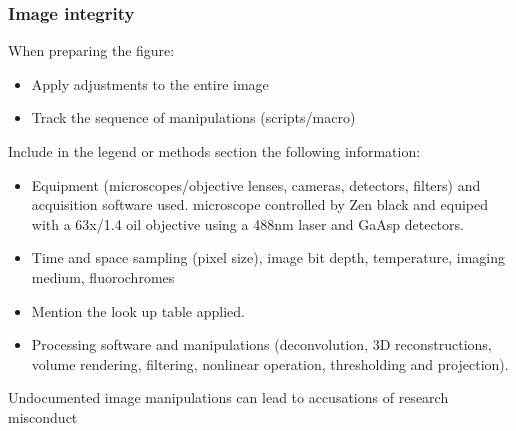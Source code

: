 \documentclass[ignorenonframetext,aspectratio=169,10pt,xcolor=table]{beamer}
\begin{document}
\begin{frame} \frametitle{Image integrity} When preparing the figure:
  \begin{itemize}
  \item Apply adjustments to the entire image
  \item Track the sequence of manipulations (scripts/macro)
  \end{itemize} Include in the legend or methods section the following
  information:
  \begin{itemize}
  \item Equipment (microscopes/objective lenses, cameras, detectors,
    filters) and acquisition software used.
    microscope controlled by Zen black and equiped with a 63x/1.4 oil
    objective using a 488nm laser and GaAsp detectors.
  \item Time and space sampling (pixel size), image bit depth,
    temperature, imaging medium, fluorochromes
  \item Mention the look up table applied.
  \item Processing software and manipulations (deconvolution, 3D
    reconstructions, volume rendering, filtering, nonlinear operation,
    thresholding and projection).
  \end{itemize}
  \begin{center}
    Undocumented image manipulations can lead to accusations of research misconduct
  \end{center}

   
\end{frame}
\end{document}
